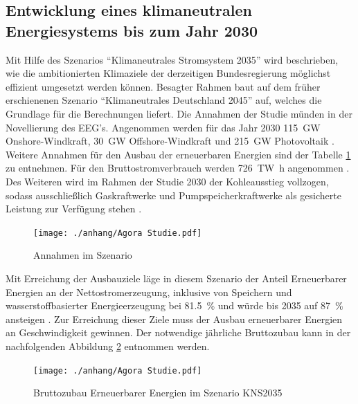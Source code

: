 	
	\subsection{Entwicklung eines klimaneutralen Energiesystems bis zum Jahr 2030} \label{sect: 2030} 
		
		Mit Hilfe des Szenarios "`Klimaneutrales Stromsystem 2035"' wird beschrieben, wie die ambitionierten Klimaziele der derzeitigen Bundesregierung möglichst effizient umgesetzt werden können. 
		Besagter Rahmen baut auf dem früher erschienenen Szenario "`Klimaneutrales Deutschland 2045"' auf, welches die Grundlage für die Berechnungen liefert. 
		Die Annahmen der Studie münden in der Novellierung des EEG's. 
		Angenommen werden für das Jahr 2030 \SI{115}{\giga\watt} Onshore-Windkraft, \SI{30}{\giga\watt} Offshore-Windkraft und \SI{215}{\giga\watt} Photovoltaik \cite[S.22]{Agora_KlimaneutralesStromsystem}. 
		Weitere Annahmen für den Ausbau der erneuerbaren Energien sind der Tabelle \ref{Abb. Annahmen Agora2035} zu entnehmen.
		Für den Bruttostromverbrauch werden \SI{726}{\tera\watt\hour} angenommen \cite[S.33]{Agora_KlimaneutralesStromsystem}. 
		Des Weiteren wird im Rahmen der Studie 2030 der Kohleausstieg vollzogen, sodass ausschließlich Gaskraftwerke und Pumpspeicherkraftwerke als gesicherte Leistung zur Verfügung stehen \cite[S.31]{Agora_KlimaneutralesStromsystem}. 
		
		\begin{figure} [H]
			\centering
			\label{Abb. Annahmen Agora2035} 
			\texttt{[image: ./anhang/Agora Studie.pdf]}
			\caption{Annahmen im Szenario \cite[S.22]{Agora_KlimaneutralesStromsystem}}
		\end{figure}
	
		Mit Erreichung der Ausbauziele läge in diesem Szenario der Anteil Erneuerbarer Energien an der Nettostromerzeugung, inklusive von Speichern und wasserstoffbasierter Energieerzeugung bei \SI{81,5}{\percent} und würde bis 2035 auf \SI{87}{\percent} ansteigen \cite[S.23]{Agora_KlimaneutralesStromsystem}.  
		Zur Erreichung dieser Ziele muss der Ausbau erneuerbarer Energien an Geschwindigkeit gewinnen. 
		Der notwendige jährliche Bruttozubau kann in der nachfolgenden Abbildung \ref{Abb.Zubau PV Agora2035} entnommen werden. 
		
		\begin{figure} [H]
			\centering
			\label{Abb.Zubau PV Agora2035} 
			\texttt{[image: ./anhang/Agora Studie.pdf]}
			\caption{Bruttozubau Erneuerbarer Energien im Szenario KNS2035 \cite[S.24]{Agora_KlimaneutralesStromsystem}}
		\end{figure}
	
